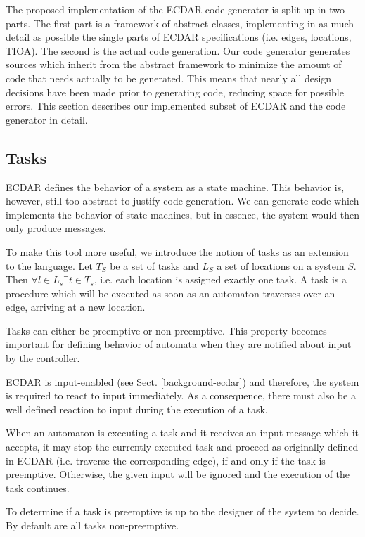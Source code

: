 The proposed implementation of the ECDAR code generator is split up
in two parts. The first part is a framework of abstract classes, implementing
in as much detail as possible the single parts of ECDAR specifications
(i.e. edges, locations, TIOA). The second is the actual code generation.
Our code generator generates sources which inherit from the abstract
framework to minimize the amount of code that needs actually to be
generated. This means that nearly all design decisions have been made
prior to generating code, reducing space for possible errors. This
section describes our implemented subset of ECDAR and the code generator
in detail.

\subsection{Tasks}

ECDAR defines the behavior of a system as a state machine. This behavior
is, however, still too abstract to justify code generation. We can
generate code which implements the behavior of state machines, but
in essence, the system would then only produce messages.

To make this tool more useful, we introduce the notion of tasks as
an extension to the language. Let $T_{S}$ be a set of tasks and $L_{S}$
a set of locations on a system $S$. Then $\forall l\in L_{s}\exists t\in T_{s}$,
i.e. each location is assigned exactly one task. A task is a procedure
which will be executed as soon as an automaton traverses over an edge,
arriving at a new location.

Tasks can either be preemptive or non-preemptive. This property becomes
important for defining behavior of automata when they are notified
about input by the controller.

ECDAR is input-enabled (see Sect. \ref{background-ecdar}) and therefore,
the system is required to react to input immediately. As a consequence,
there must also be a well defined reaction to input during the execution
of a task.

When an automaton is executing a task and it receives an input message
which it accepts, it may stop the currently executed task and proceed
as originally defined in ECDAR (i.e. traverse the corresponding edge),
if and only if the task is preemptive. Otherwise, the given input
will be ignored and the execution of the task continues.

To determine if a task is preemptive is up to the designer of the
system to decide. By default are all tasks non-preemptive.

